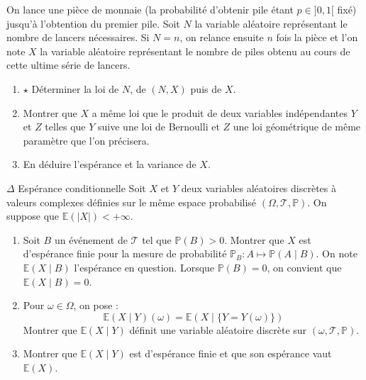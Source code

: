 \documentclass[french,a4paper]{article}
\renewcommand{\P}{\mathbb{P}}
\newcommand{\E}{\mathbb{E}}
\theoremstyle{plain}
\theoremstyle{definition}
\theoremstyle{remark}
\begin{document}
\begin{ex}{}
	On lance une pièce de monnaie (la probabilité d'obtenir pile étant $p\in]0,1[$ fixé) jusqu'à l'obtention du premier pile. Soit $N$ la variable aléatoire représentant le nombre de lancers nécessaires. Si $N=n$, on relance ensuite $n$ fois la pièce et l'on note $X$ la variable aléatoire représentant le nombre de piles obtenu au cours de cette ultime série de lancers.
	\begin{enumerate}
		\item $\star$ Déterminer la loi de $N$, de $(N,X)$ puis de $X$.
		\item Montrer que $X$ a même loi que le produit de deux variables indépendantes $Y$ et $Z$ telles que $Y$ suive une loi de Bernoulli et $Z$ une loi géométrique de même paramètre que l'on précisera.
		\item En déduire l'espérance et la variance de $X$.
	\end{enumerate}
\end{ex}

\begin{ex}{$\Delta$ Espérance conditionnelle}
	Soit $X$ et $Y$ deux variables aléatoires discrètes à valeurs complexes définies sur le même espace probabilisé $(\Omega,\mathcal{T},\P)$. On suppose que $\E(\lvert X\rvert)<+\infty$.
	\begin{enumerate}
		\item Soit $B$ un événement de $\mathcal{T}$ tel que $\P(B)>0$. Montrer que $X$ est d'espérance finie pour la mesure de probabilité $\P_B:A\mapsto\P(A\mid B)$. On note $\E(X\mid B)$ l'espérance en question. Lorsque $\P(B)=0$, on convient que $\E(X\mid B)=0$.
		\item Pour $\omega\in\Omega$, on pose : $$\E(X\mid Y)(\omega)=\E(X\mid \{Y=Y(\omega)\})$$ Montrer que $\E(X\mid Y)$ définit une variable aléatoire discrète sur $(\omega,\mathcal{T},\P)$.
		\item Montrer que $\E(X\mid Y)$ est d'espérance finie et que son espérance vaut $\E(X)$.
	\end{enumerate}
\end{ex}
\end{document}
